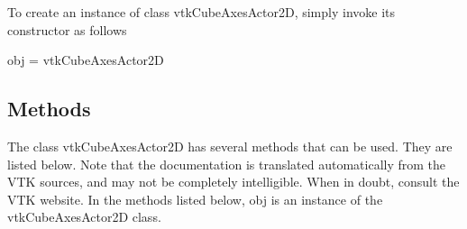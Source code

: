 To create an instance of class vtk\-Cube\-Axes\-Actor2\-D, simply invoke its constructor as follows \begin{DoxyVerb}  obj = vtkCubeAxesActor2D
\end{DoxyVerb}
 \hypertarget{vtkwidgets_vtkxyplotwidget_Methods}{}\subsection{Methods}\label{vtkwidgets_vtkxyplotwidget_Methods}
The class vtk\-Cube\-Axes\-Actor2\-D has several methods that can be used. They are listed below. Note that the documentation is translated automatically from the V\-T\-K sources, and may not be completely intelligible. When in doubt, consult the V\-T\-K website. In the methods listed below, {\ttfamily obj} is an instance of the vtk\-Cube\-Axes\-Actor2\-D class. 

